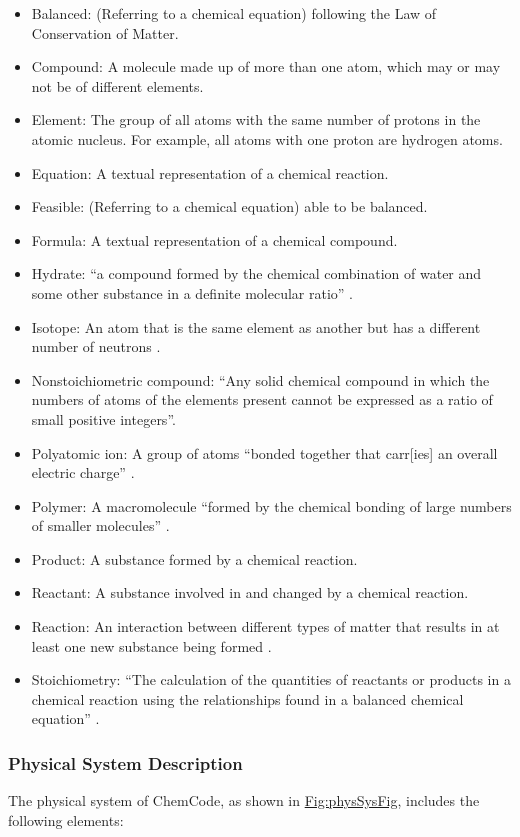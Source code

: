 \documentclass[12pt]{article}
\begin{document}
\begin{itemize}
\item{Balanced: (Referring to a chemical equation) following the Law of Conservation of Matter.}
\item{Compound: A molecule made up of more than one atom, which may or may not be of different elements.}
\item{Element: The group of all atoms with the same number of protons in the atomic nucleus. For example, all atoms with one proton are hydrogen atoms.}
\item{Equation: A textual representation of a chemical reaction.}
\item{Feasible: (Referring to a chemical equation) able to be balanced.}
\item{Formula: A textual representation of a chemical compound.}
\item{Hydrate: ``a compound formed by the chemical combination of water and some other substance in a definite molecular ratio'' \cite{hydrateSource}.}
\item{Isotope: An atom that is the same element as another but has a different number of neutrons \cite{lund2023}.}
\item{Nonstoichiometric compound: ``Any solid chemical compound in which the numbers of atoms of the elements present cannot be expressed as a ratio of small positive integers''.}
\item{Polyatomic ion: A group of atoms ``bonded together that carr[ies] an overall electric charge'' \cite{lund2023}.}
\item{Polymer: A macromolecule ``formed by the chemical bonding of large numbers of smaller molecules'' \cite{polymerSource}.}
\item{Product: A substance formed by a chemical reaction.}
\item{Reactant: A substance involved in and changed by a chemical reaction.}
\item{Reaction: An interaction between different types of matter that results in at least one new substance being formed \cite{lund2023}.}
\item{Stoichiometry: ``The calculation of the quantities of reactants or products in a chemical reaction using the relationships found in a balanced chemical equation'' \cite[(pg. 337)]{lund2023}.}
\end{itemize}
\subsubsection{Physical System Description}
\label{Sec:PhysSyst}
The physical system of ChemCode, as shown in \hyperref[Figure:physSysFig]{Fig:physSysFig}, includes the following elements:
\end{document}
